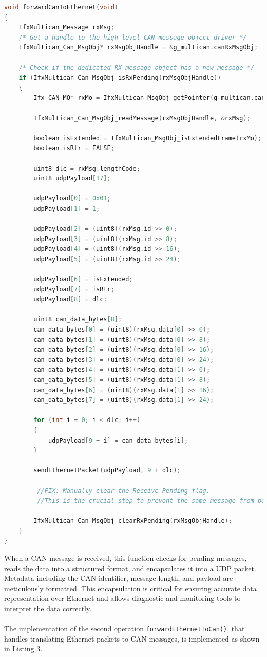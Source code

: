 \begin{lstlisting}[language=C, caption={CAN to Ethernet message translation (Gateway.c)}, label={lst:can_to_eth}]
void forwardCanToEthernet(void)
{
    IfxMultican_Message rxMsg;
    /* Get a handle to the high-level CAN message object driver */
    IfxMultican_Can_MsgObj* rxMsgObjHandle = &g_multican.canRxMsgObj;

    /* Check if the dedicated RX message object has a new message */
    if (IfxMultican_Can_MsgObj_isRxPending(rxMsgObjHandle))
    {
        Ifx_CAN_MO* rxMo = IfxMultican_MsgObj_getPointer(g_multican.can.mcan, rxMsgObjHandle->msgObjId);

        IfxMultican_Can_MsgObj_readMessage(rxMsgObjHandle, &rxMsg);

        boolean isExtended = IfxMultican_MsgObj_isExtendedFrame(rxMo);
        boolean isRtr = FALSE;

        uint8 dlc = rxMsg.lengthCode;
        uint8 udpPayload[17];

        udpPayload[0] = 0x01;
        udpPayload[1] = 1;

        udpPayload[2] = (uint8)(rxMsg.id >> 0);
        udpPayload[3] = (uint8)(rxMsg.id >> 8);
        udpPayload[4] = (uint8)(rxMsg.id >> 16);
        udpPayload[5] = (uint8)(rxMsg.id >> 24);

        udpPayload[6] = isExtended;
        udpPayload[7] = isRtr;
        udpPayload[8] = dlc;

        uint8 can_data_bytes[8];
        can_data_bytes[0] = (uint8)(rxMsg.data[0] >> 0);
        can_data_bytes[1] = (uint8)(rxMsg.data[0] >> 8);
        can_data_bytes[2] = (uint8)(rxMsg.data[0] >> 16);
        can_data_bytes[3] = (uint8)(rxMsg.data[0] >> 24);
        can_data_bytes[4] = (uint8)(rxMsg.data[1] >> 0);
        can_data_bytes[5] = (uint8)(rxMsg.data[1] >> 8);
        can_data_bytes[6] = (uint8)(rxMsg.data[1] >> 16);
        can_data_bytes[7] = (uint8)(rxMsg.data[1] >> 24);

        for (int i = 0; i < dlc; i++)
        {
            udpPayload[9 + i] = can_data_bytes[i];
        }

        sendEthernetPacket(udpPayload, 9 + dlc);

         //FIX: Manually clear the Receive Pending flag.
         //This is the crucial step to prevent the same message from being read again.
         
        IfxMultican_Can_MsgObj_clearRxPending(rxMsgObjHandle);
    }
}
\end{lstlisting}
When a CAN message is received, this function checks for pending messages, reads the data into a structured format, and encapsulates it into a UDP packet. Metadata including the CAN identifier, message length, and payload are meticulously formatted. This encapsulation is critical for ensuring accurate data representation over Ethernet and allows diagnostic and monitoring tools to interpret the data correctly.\\\\
The implementation of the second operation \verb|forwardEthernetToCan()|, that handles translating Ethernet packets to CAN messages, is implemented as shown in Listing 3.

